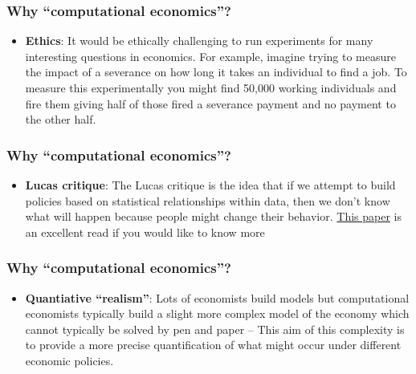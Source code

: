 \documentclass[10pt]{beamer}
\begin{document}
  \begin{frame} \frametitle{Why ``computational economics''?}

    \begin{itemize}
      \item \textbf{Ethics}: It would be ethically challenging to run experiments for many
        interesting questions in economics. For example, imagine trying to measure the impact of
        a severance on how long it takes an individual to find a job. To measure this
        experimentally you might find 50,000 working individuals and fire them giving half of
        those fired a severance payment and no payment to the other half.
    \end{itemize}
  \end{frame}


  \begin{frame} \frametitle{Why ``computational economics''?}

    \begin{itemize}
      \item \textbf{Lucas critique}: The Lucas critique is the idea that if we attempt to build
        policies based on statistical relationships within data, then we don't know what will
        happen because people might change their behavior.
        \href{http://www.tomsargent.com/research/Critique_Consequence.pdf}{This paper} is an
        excellent read if you would like to know more
    \end{itemize}
  \end{frame}


  \begin{frame} \frametitle{Why ``computational economics''?}

    \begin{itemize}
      \item \textbf{Quantiative ``realism''}: Lots of economists build models but computational
        economists typically build a slight more complex model of the economy which cannot
        typically be solved by pen and paper -- This aim of this complexity is to provide a more
        precise quantification of what might occur under different economic policies.
    \end{itemize}
  \end{frame}
\end{document}
